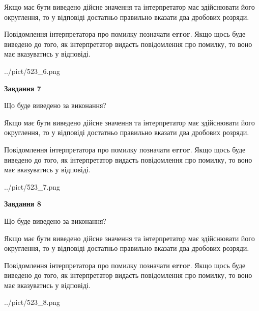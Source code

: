 \documentclass[12pt, ukrainian]{article}
\begin{document}
{\begin {Large}
Якщо має бути виведено дійсне значення та інтерпретатор має здійснювати його округлення, 
то у відповіді достатньо правильно вказати два дробових розряди.

Повідомлення інтерпретатора про помилку позначати \textbf{error}.
Якщо щось буде виведено до того, як інтерпретатор видасть повідомлення про помилку, 
то воно має вказуватись у відповіді. \par

\begin{center}
	{../pict/523_6.png}
\end{center}
\newpage

{\begin {center}\textbf{Завдання 7}\end {center}}\par
Що буде виведено за виконання? \par

Якщо має бути виведено дійсне значення та інтерпретатор має здійснювати його округлення, 
то у відповіді достатньо правильно вказати два дробових розряди.

Повідомлення інтерпретатора про помилку позначати \textbf{error}.
Якщо щось буде виведено до того, як інтерпретатор видасть повідомлення про помилку, 
то воно має вказуватись у відповіді. \par

\begin{center}
	{../pict/523_7.png}
\end{center}
\newpage

{\begin {center}\textbf{Завдання 8}\end {center}}\par
Що буде виведено за виконання? \par

Якщо має бути виведено дійсне значення та інтерпретатор має здійснювати його округлення, 
то у відповіді достатньо правильно вказати два дробових розряди.

Повідомлення інтерпретатора про помилку позначати \textbf{error}.
Якщо щось буде виведено до того, як інтерпретатор видасть повідомлення про помилку, 
то воно має вказуватись у відповіді. \par

\begin{center}
	{../pict/523_8.png}
\end{center}
\newpage


\end{Large}}
\end{document}
